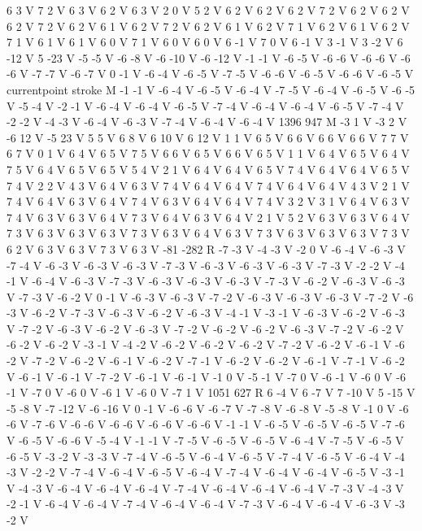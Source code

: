 {6 3 V
7 2 V
6 3 V
6 2 V
6 3 V
2 0 V
5 2 V
6 2 V
6 2 V
6 2 V
7 2 V
6 2 V
6 2 V
6 2 V
7 2 V
6 2 V
6 1 V
6 2 V
7 2 V
6 2 V
6 1 V
6 2 V
7 1 V
6 2 V
6 1 V
6 2 V
7 1 V
6 1 V
6 1 V
6 0 V
7 1 V
6 0 V
6 0 V
6 -1 V
7 0 V
6 -1 V
3 -1 V
3 -2 V
6 -12 V
5 -23 V
-5 -5 V
-6 -8 V
-6 -10 V
-6 -12 V
-1 -1 V
-6 -5 V
-6 -6 V
-6 -6 V
-6 -6 V
-7 -7 V
-6 -7 V
0 -1 V
-6 -4 V
-6 -5 V
-7 -5 V
-6 -6 V
-6 -5 V
-6 -6 V
-6 -5 V
currentpoint stroke M
-1 -1 V
-6 -4 V
-6 -5 V
-6 -4 V
-7 -5 V
-6 -4 V
-6 -5 V
-6 -5 V
-5 -4 V
-2 -1 V
-6 -4 V
-6 -4 V
-6 -5 V
-7 -4 V
-6 -4 V
-6 -4 V
-6 -5 V
-7 -4 V
-2 -2 V
-4 -3 V
-6 -4 V
-6 -3 V
-7 -4 V
-6 -4 V
-6 -4 V
1396 947 M
-3 1 V
-3 2 V
-6 12 V
-5 23 V
5 5 V
6 8 V
6 10 V
6 12 V
1 1 V
6 5 V
6 6 V
6 6 V
6 6 V
7 7 V
6 7 V
0 1 V
6 4 V
6 5 V
7 5 V
6 6 V
6 5 V
6 6 V
6 5 V
1 1 V
6 4 V
6 5 V
6 4 V
7 5 V
6 4 V
6 5 V
6 5 V
5 4 V
2 1 V
6 4 V
6 4 V
6 5 V
7 4 V
6 4 V
6 4 V
6 5 V
7 4 V
2 2 V
4 3 V
6 4 V
6 3 V
7 4 V
6 4 V
6 4 V
7 4 V
6 4 V
6 4 V
4 3 V
2 1 V
7 4 V
6 4 V
6 3 V
6 4 V
7 4 V
6 3 V
6 4 V
6 4 V
7 4 V
3 2 V
3 1 V
6 4 V
6 3 V
7 4 V
6 3 V
6 3 V
6 4 V
7 3 V
6 4 V
6 3 V
6 4 V
2 1 V
5 2 V
6 3 V
6 3 V
6 4 V
7 3 V
6 3 V
6 3 V
6 3 V
7 3 V
6 3 V
6 4 V
6 3 V
7 3 V
6 3 V
6 3 V
6 3 V
7 3 V
6 2 V
6 3 V
6 3 V
7 3 V
6 3 V
-81 -282 R
-7 -3 V
-4 -3 V
-2 0 V
-6 -4 V
-6 -3 V
-7 -4 V
-6 -3 V
-6 -3 V
-6 -3 V
-7 -3 V
-6 -3 V
-6 -3 V
-6 -3 V
-7 -3 V
-2 -2 V
-4 -1 V
-6 -4 V
-6 -3 V
-7 -3 V
-6 -3 V
-6 -3 V
-6 -3 V
-7 -3 V
-6 -2 V
-6 -3 V
-6 -3 V
-7 -3 V
-6 -2 V
0 -1 V
-6 -3 V
-6 -3 V
-7 -2 V
-6 -3 V
-6 -3 V
-6 -3 V
-7 -2 V
-6 -3 V
-6 -2 V
-7 -3 V
-6 -3 V
-6 -2 V
-6 -3 V
-4 -1 V
-3 -1 V
-6 -3 V
-6 -2 V
-6 -3 V
-7 -2 V
-6 -3 V
-6 -2 V
-6 -3 V
-7 -2 V
-6 -2 V
-6 -2 V
-6 -3 V
-7 -2 V
-6 -2 V
-6 -2 V
-6 -2 V
-3 -1 V
-4 -2 V
-6 -2 V
-6 -2 V
-6 -2 V
-7 -2 V
-6 -2 V
-6 -1 V
-6 -2 V
-7 -2 V
-6 -2 V
-6 -1 V
-6 -2 V
-7 -1 V
-6 -2 V
-6 -2 V
-6 -1 V
-7 -1 V
-6 -2 V
-6 -1 V
-6 -1 V
-7 -2 V
-6 -1 V
-6 -1 V
-1 0 V
-5 -1 V
-7 0 V
-6 -1 V
-6 0 V
-6 -1 V
-7 0 V
-6 0 V
-6 1 V
-6 0 V
-7 1 V
1051 627 R
6 -4 V
6 -7 V
7 -10 V
5 -15 V
-5 -8 V
-7 -12 V
-6 -16 V
0 -1 V
-6 -6 V
-6 -7 V
-7 -8 V
-6 -8 V
-5 -8 V
-1 0 V
-6 -6 V
-7 -6 V
-6 -6 V
-6 -6 V
-6 -6 V
-6 -6 V
-1 -1 V
-6 -5 V
-6 -5 V
-6 -5 V
-7 -6 V
-6 -5 V
-6 -6 V
-5 -4 V
-1 -1 V
-7 -5 V
-6 -5 V
-6 -5 V
-6 -4 V
-7 -5 V
-6 -5 V
-6 -5 V
-3 -2 V
-3 -3 V
-7 -4 V
-6 -5 V
-6 -4 V
-6 -5 V
-7 -4 V
-6 -5 V
-6 -4 V
-4 -3 V
-2 -2 V
-7 -4 V
-6 -4 V
-6 -5 V
-6 -4 V
-7 -4 V
-6 -4 V
-6 -4 V
-6 -5 V
-3 -1 V
-4 -3 V
-6 -4 V
-6 -4 V
-6 -4 V
-7 -4 V
-6 -4 V
-6 -4 V
-6 -4 V
-7 -3 V
-4 -3 V
-2 -1 V
-6 -4 V
-6 -4 V
-7 -4 V
-6 -4 V
-6 -4 V
-7 -3 V
-6 -4 V
-6 -4 V
-6 -3 V
-3 -2 V
}
